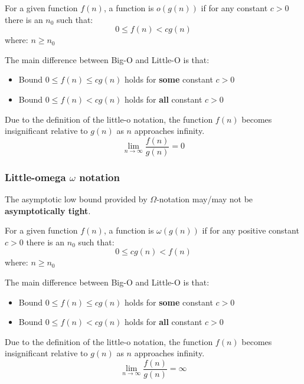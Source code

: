 \documentclass[10pt,a4paper]{article}
\begin{document}
\begin{tcolorbox}[breakable,colback=white]
    For a given function $f(n)$, a function is $o(g(n))$ if for any constant $c>0$ there is an $n_0$
    such that:
    $$
        0 \leq f(n) < cg(n)
    $$
    where: $n\geq n_0$
\end{tcolorbox}

The main difference between Big-O and Little-O is that:
\begin{itemize}
    \item Bound $0\leq f(n) \leq cg(n)$ holds for \textbf{some} constant $c>0$
    \item Bound $0\leq f(n) < cg(n)$ holds for \textbf{all} constant $c>0$ 
\end{itemize}

Due to the definition of the little-o notation, the function $f(n)$ becomes insignificant relative
to $g(n)$ as $n$ approaches infinity.
$$
\lim_{n\rightarrow \infty} \frac{f(n)}{g(n)} = 0
$$

\subsubsection{Little-omega $\omega$ notation}

The asymptotic low bound provided by $\Omega$-notation may/may not be \textbf{asymptotically tight}.

\begin{tcolorbox}[breakable,colback=white]
    For a given function $f(n)$, a function is $\omega(g(n))$ if for any positive constant $c>0$ there is an $n_0$
    such that:
    $$
        0 \leq cg(n) < f(n)
    $$
    where: $n\geq n_0$
\end{tcolorbox}

The main difference between Big-O and Little-O is that:
\begin{itemize}
    \item Bound $0\leq f(n) \leq cg(n)$ holds for \textbf{some} constant $c>0$
    \item Bound $0\leq f(n) < cg(n)$ holds for \textbf{all} constant $c>0$ 
\end{itemize}

Due to the definition of the little-o notation, the function $f(n)$ becomes insignificant relative
to $g(n)$ as $n$ approaches infinity.
$$
\lim_{n\rightarrow \infty} \frac{f(n)}{g(n)} = \infty
$$

\end{document}
